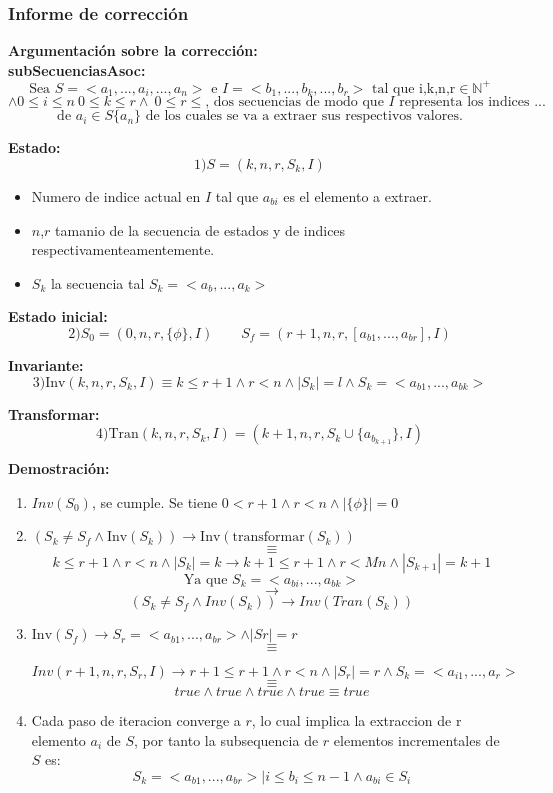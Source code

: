 \documentclass[12pt, a4paper]{article}
\begin{document}
\subsubsection{Informe de corrección}
\textbf{Argumentación sobre la corrección: \\}
\textbf{subSecuenciasAsoc: } \\
\[ \text{Sea } S =<a_1,...,a_i,...,a_n> \text{ e } I=<b_1,...,b_k,...,b_r>\text{ tal que i,k,n,r} \in \mathbb{N}^{+} \]
\[ \land 0 \leqslant i \leqslant n~ 0 \leqslant k \leqslant r \land~ 0 \leqslant r \leqslant \text{, dos secuencias de modo que $I$ representa los indices ... }\]
\[\text{de $a_i \in S\{a_n\}$ de los cuales se va a extraer sus respectivos valores.}\]

\textbf{Estado:}
\[ 1) S=(k,n,r,S_k,I) \]
\begin{itemize}
  \item Numero de indice actual en $I$ tal que $a_{bi}$ es el elemento a extraer.
  \item $n$,$r$ tamanio de la secuencia de estados y de indices respectivamenteamentemente.
  \item $S_k$ la secuencia tal $S_k = <a_{b},...,a_k>$
\end{itemize}


\textbf{Estado inicial:}
\[ 2) S_0 =(0,n,r,\{\phi\},I) \qquad S_f=(r+1,n,r,[a_{b1},...,a_{br}],I) \]


\textbf{Invariante:}
\[ 3) \text{Inv}(k,n,r,S_k,I) \equiv k \leq r+1 \land r < n \land |S_k| = l \land S_k =<a_{b1},...,a_{bk}>\]

\textbf{Transformar:}
\[ 4) \text{Tran}(k,n,r,S_k,I) = (k+1,n,r,S_k \cup \{a_{b_{k+1}}\},I) \]

\textbf{Demostración:}

\begin{enumerate}
  \item $Inv(S_0)$, se cumple. Se tiene $0 < r+1 \land r<n \land |\{\phi\}|=0$ 
  \item \( (S_k \neq S_f \land \text{Inv}(S_k)) \rightarrow \text{Inv}(\text{transformar}(S_k)) \)
  \[\equiv\]
  \[k\leq r+1 \land r < n \land |S_k|=k \rightarrow k+1 \leq r+1 \land r <Mn \land |S_{k+1}|=k+1\]
  \[ \text{Ya que } S_k =<a_{bi},...,a_{bk}>\]
  \[ \rightarrow\]
  \[ (S_k \neq S_f \land Inv(S_k)) \rightarrow Inv(Tran(S_k))\]
  \item \( \text{Inv}(S_f) \rightarrow S_r =<a_{b1},...,a_{br}>\land |Sr|=r\)
  \[ \equiv\]

  \[Inv(r+1,n,r,S_r,I) \rightarrow r+1 \leq r+1 \land r<n \land |S_r| = r \land S_k = <a_{i1},...,a_{r}> \]
  \[ \equiv \]
  \[ true \land true\land true \land true \equiv true\]
  \item Cada paso de iteracion converge a $r$, lo cual implica la extraccion de r elemento $a_i$ de $S$, por tanto la subsequencia de $r$ elementos incrementales de $S$ es:
  \[ S_k =<a_{b1},...,a_{br}> |  i \leq b_i \leq n-1 \land a_{bi}\in S_i\]
\end{enumerate}
\end{document}
